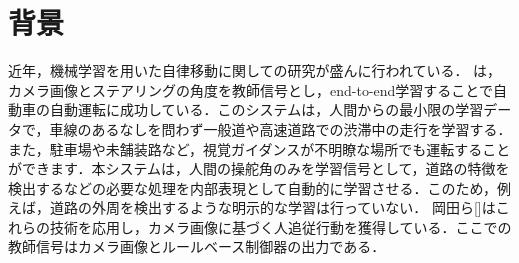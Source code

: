 
\section{背景}
近年，機械学習を用いた自律移動に関しての研究が盛んに行われている．
は，カメラ画像とステアリングの角度を教師信号とし，end-to-end学習することで自動車の自動運転に成功している．このシステムは，人間からの最小限の学習データで，車線のあるなしを問わず一般道や高速道路での渋滞中の走行を学習する．また，駐車場や未舗装路など，視覚ガイダンスが不明瞭な場所でも運転することができます．本システムは，人間の操舵角のみを学習信号として，道路の特徴を検出するなどの必要な処理を内部表現として自動的に学習させる．このため，例えば，道路の外周を検出するような明示的な学習は行っていない．
岡田ら[]はこれらの技術を応用し，カメラ画像に基づく人追従行動を獲得している．ここでの教師信号はカメラ画像とルールベース制御器の出力である．

